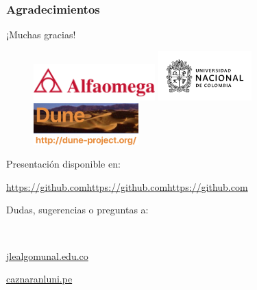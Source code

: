 \begin{frame}
	\frametitle{Agradecimientos}
	\begin{center}\LARGE
		¡Muchas gracias!
	\end{center}
	\begin{figure}[ht!]
		\centering
		\includegraphics[height=1.4cm]{alfaomega}\quad
		\includegraphics[height=1.9cm]{unal}\quad
		\includegraphics[height=1.6cm]{dune-logo}
	\end{figure}
	\vfill
	\begin{minipage}{0.75\paperwidth}
		\textcolor{c++reviewduneblue}{Presentación disponible en:}
		\begin{center}
			\href{https://github.comhttps://github.comhttps://github.com}{\url{https://github.comhttps://github.comhttps://github.com}}
		\end{center}
	\end{minipage}
	\hfill
	\begin{minipage}{0.25\paperwidth}
		\begin{flushright}
			Dudas, sugerencias o preguntas a:

			\

			\href{mailto:jlealgom@unal.edu.co}{jlealgom\MVAt unal.edu.co}

			\href{mailto:caznaranl@uni.pe}{caznaranl\MVAt uni.pe}
		\end{flushright}
	\end{minipage}

\end{frame}